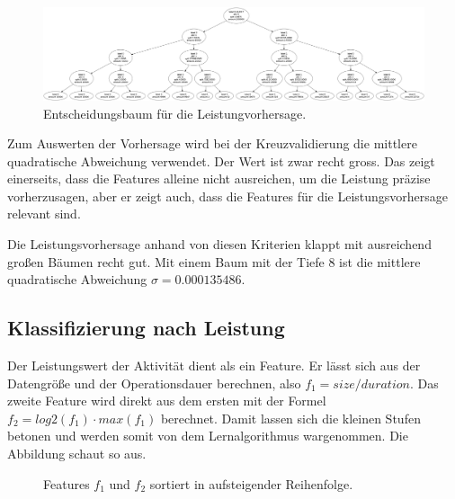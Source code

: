 \begin{figure}[ht]
	\centering
	\includegraphics[width=\textwidth]{pictures/predictor.png}
	\caption{Entscheidungsbaum für die Leistungvorhersage.}
	\label{fig:eva:predTree}
\end{figure}

Zum Auswerten der Vorhersage wird bei der Kreuzvalidierung die mittlere quadratische Abweichung verwendet.
Der Wert ist zwar recht gross.
Das zeigt einerseits, dass die Features alleine nicht ausreichen, um die Leistung präzise vorherzusagen, aber er zeigt auch, dass die Features für die Leistungsvorhersage relevant sind.


Die Leistungsvorhersage anhand von diesen Kriterien klappt mit ausreichend großen Bäumen recht gut.
Mit einem Baum mit der Tiefe 8 ist die mittlere quadratische Abweichung $\sigma = 0.000135486$.


\subsection{Klassifizierung nach Leistung}

Der Leistungswert der Aktivität dient als ein Feature.
Er lässt sich aus der Datengröße und der Operationsdauer berechnen, also $f_1 = size / duration$.
Das zweite Feature wird direkt aus dem ersten mit der Formel $f_2 = log2(f_1) \cdot max(f_1)$ berechnet.
Damit lassen sich die kleinen Stufen betonen und werden somit von dem Lernalgorithmus wargenommen.
Die Abbildung  schaut so aus.

\begin{figure}[ht]
	\hfill
	\hfill
	\hfill
	\caption{Features $f_1$ und $f_2$ sortiert in aufsteigender Reihenfolge.}
	\label{fig:eva:transfeats}
\end{figure}



